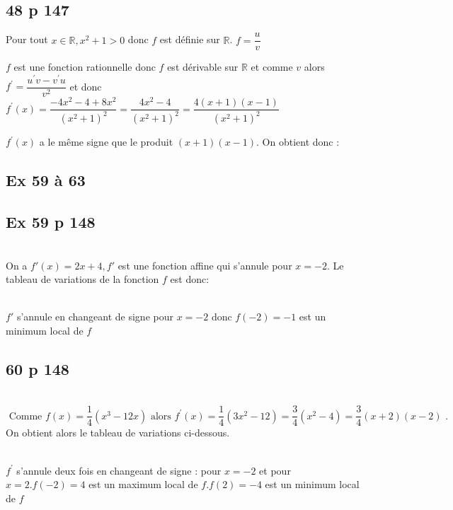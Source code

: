 \documentclass[12pt,a4paper]{book}
\begin{document}
\subsection*{48 p 147}
\begin{enumMet}
    \item Pour tout $x \in \mathbb{R}, x^{2}+1>0$ donc $f$ est définie sur $\mathbb{R}$. $f=\dfrac{u}{v}$
    \item $f$ est une fonction rationnelle donc $f$ est dérivable sur $\mathbb{R}$ et comme $v$ alors $f^{\prime}=\dfrac{u^{\prime} v-v^{\prime} u}{v^{2}}$ et donc
    $f^{\prime}(x)=\dfrac{-4 x^{2}-4+8 x^{2}}{\left(x^{2}+1\right)^{2}}=\dfrac{4 x^{2}-4}{\left(x^{2}+1\right)^{2}}=\dfrac{4(x+1)(x-1)}{\left(x^{2}+1\right)^{2}}$
    \item $f^{\prime}(x)$ a le même signe que le produit $(x+1)(x-1)$. On obtient donc :
\end{enumMet}

\subsection*{Ex 59 à 63}

\subsection*{Ex 59 p 148}
\\
On a $f'(x)=2 x+4, f'$ est une fonction affine qui s'annule pour $x=-2$. Le tableau de variations de la fonction $f$ est donc:\\
\\
$f'$ s'annule en changeant de signe pour $x=-2$ donc $f(-2)=-1$ est un minimum local de $f$

\subsection*{60 p 148}
\\
$$
\text { Comme }f(x)=\frac{1}{4}\left(x^{3}-12 x\right) \text { alors } f^{\prime}(x)=\frac{1}{4}\left(3 x^{2}-12\right)=\frac{3}{4}\left(x^{2}-4\right)=\frac{3}{4}(x+2)(x-2) \text { . }
$$
On obtient alors le tableau de variations ci-dessous.\\
\\
    $f^{\prime}$ s'annule deux fois en changeant de signe : pour $x=-2$ et pour $x=2 . f(-2)=4$ est un maximum local de $f . f(2)=-4$ est un minimum local de $f$
\end{document}
